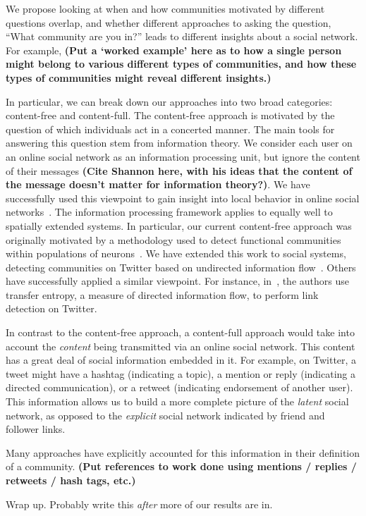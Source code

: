 We propose looking at when and how communities motivated by different questions overlap, and whether different approaches to asking the question, ``What community are you in?'' leads to different insights about a social network. For example, \textbf{(Put a `worked example' here as to how a single person might belong to various different types of communities, and how these types of communities might reveal different insights.)}

In particular, we can break down our approaches into two broad categories: content-free and content-full. The content-free approach is motivated by the question of which individuals act in a concerted manner. The main tools for answering this question stem from information theory. We consider each user on an online social network as an information processing unit, but ignore the content of their messages \textbf{(Cite Shannon here, with his ideas that the content of the message doesn't matter for information theory?)}. We have successfully used this viewpoint to gain insight into local behavior in online social networks~\cite{darmon2013understanding}. The information processing framework applies to equally well to spatially extended systems. In particular, our current content-free approach was originally motivated by a methodology used to detect functional communities within populations of neurons~\cite{shalizi2007discovering}. We have extended this work to social systems, detecting communities on Twitter based on undirected information flow~\cite{darmon2013detecting}. Others have successfully applied a similar viewpoint. For instance, in~\cite{ver2012information}, the authors use transfer entropy, a measure of directed information flow, to perform link detection on Twitter.

In contrast to the content-free approach, a content-full approach would take into account the \emph{content} being transmitted via an online social network. This content has a great deal of social information embedded in it. For example, on Twitter, a tweet might have a hashtag (indicating a topic), a mention or reply (indicating a directed communication), or a retweet (indicating endorsement of another user). This information allows us to build a more complete picture of the \emph{latent} social network, as opposed to the \emph{explicit} social network indicated by friend and follower links.

Many approaches have explicitly accounted for this information in their definition of a community. \textbf{(Put references to work done using mentions / replies / retweets / hash tags, etc.)}

Wrap up. Probably write this \emph{after} more of our results are in.